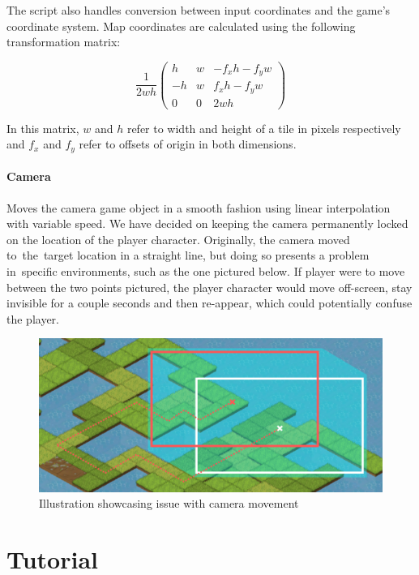 \documentclass[thesis=B,english,hidelinks]{FITthesisXE}[2012/06/26]
\begin{document}
The script also handles conversion between input coordinates and the game's coordinate system. Map coordinates are calculated using the following transformation matrix:

\[
\frac{1}{2wh} 
\begin{pmatrix}
h & w & -f_{x}h - f_{y}w \\
-h & w & f_{x}h - f_{y}w \\
0 & 0 & 2wh
\end{pmatrix}
\]

In this matrix, $w$ and $h$ refer to width and height of a tile in pixels respectively and $f_{x}$ and $f_{y}$ refer to offsets of origin in both dimensions\autocite{sojka}.

\subsubsection{Camera}

Moves the camera game object in a smooth fashion using linear interpolation with variable speed. We have decided on keeping the camera permanently locked on the location of the player character. Originally, the camera moved to~the~target location in a straight line, but doing so presents a problem in~specific environments, such as the one pictured below. If player were to move between the two points pictured, the player character would move off-screen, stay invisible for a couple seconds and then re-appear, which could potentially confuse the player.

\begin{figure}[ht]
\centering
\includegraphics[scale=1]{camera_change}
\caption{Illustration showcasing issue with camera movement}
\label{fig:camera_change}
\end{figure}

\chapter{Tutorial}
\end{document}
